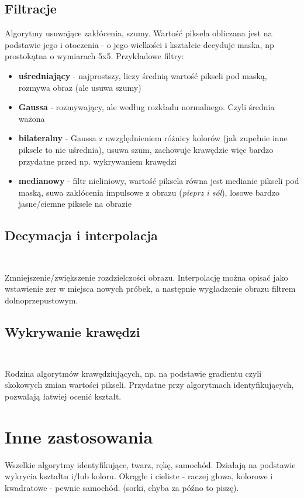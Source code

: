 \documentclass[]{report}
\begin{document}
\subsection{Filtracje}
Algorytmy usuwające zakłócenia, szumy. Wartość piksela obliczana jest na podstawie jego i otoczenia - o jego wielkości i kształcie decyduje maska, np prostokątna o wymiarach 5x5. Przykładowe filtry:

\begin{itemize}
	\item \textbf{uśredniający} - najprostszy, liczy średnią wartość pikseli pod maską, rozmywa obraz (ale usuwa szumy)
	\item \textbf{Gaussa} - rozmywający, ale według rozkładu normalnego. Czyli średnia ważona
	\item \textbf{bilateralny} - Gaussa z uwzględnieniem różnicy kolorów (jak zupełnie inne piksele to nie uśrednia), usuwa szum, zachowuje krawędzie więc bardzo przydatne przed np. wykrywaniem krawędzi 
	\item \textbf{medianowy} - filtr nieliniowy, wartość piksela równa jest medianie pikseli pod maską, suwa zakłócenia impulsowe z obrazu (\textit{pieprz i sól}), losowe bardzo jasne/ciemne piksele na obrazie
\end{itemize}

\subsection{Decymacja i interpolacja\\\\}
Zmniejszenie/zwiększenie rozdzielczości obrazu. Interpolację można opisać jako wstawienie zer w miejsca nowych próbek, a następnie wygładzenie obrazu filtrem dolnoprzepustowym.

\subsection{Wykrywanie krawędzi\\\\}
Rodzina algorytmów krawędziujących, np. na podstawie gradientu czyli skokowych zmian wartości pikseli. Przydatne przy algorytmach identyfikujących, pozwalają łatwiej ocenić kształt.

\section{Inne zastosowania}
Wszelkie algorytmy identyfikujące, twarz, rękę, samochód. Działają na podstawie wykrycia kształtu i/lub koloru. Okrągłe i cieliste - raczej głowa, kolorowe i kwadratowe - pewnie samochód. (sorki, chyba za późno to piszę).
\end{document}
